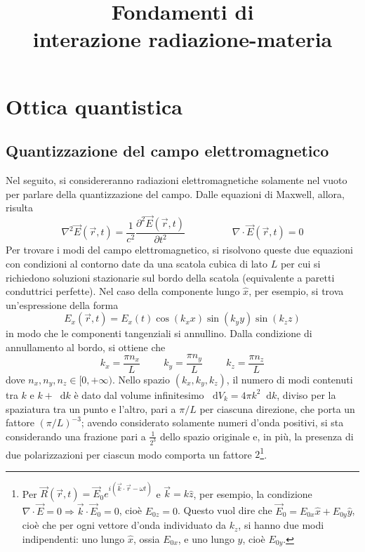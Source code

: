 \documentclass[11pt, a4paper]{scrartcl}
\title{Fondamenti di\\ \vspace{.15cm} interazione radiazione-materia}
\author{}
\date{}
\theoremstyle{style}
\renewcommand{\maketitle}{
\begin{center}
{\sffamily
{\fontsize{20}{20}\selectfont\MakeUppercase\thetitle}}

\vspace{0.2in}

{\large\scshape\sffamily\theauthor}
\end{center}
}
\newcommand{\dd}{\mathop{}\!\mathrm{d}}
\numberwithin{equation}{subsection}
\begin{document}
\maketitle
\newpage
\tableofcontents 
\newpage
\section{Ottica quantistica}

\subsection{Quantizzazione del campo elettromagnetico}

Nel seguito, si considereranno radiazioni elettromagnetiche solamente nel vuoto per parlare della quantizzazione del campo.
Dalle equazioni di Maxwell, allora, risulta
\begin{equation}
	\nabla ^2 \vec{E}(\vec{r},t) = \frac{1}{c^2} \frac{\partial ^2 \vec{E}(\vec{r},t)}{\partial t^2}  \hspace{2cm} \nabla \cdot \vec{E}(\vec{r},t) = 0
\end{equation}
Per trovare i modi del campo elettromagnetico, si risolvono queste due equazioni con condizioni al contorno date da una scatola cubica di lato $L$ per cui si richiedono soluzioni stazionarie sul bordo della scatola (equivalente a paretti conduttrici perfette).
Nel caso della componente lungo $\hat{x}$, per esempio, si trova un'espressione della forma 
\begin{equation}
	E_x(\vec{r},t) = E_x(t) \cos (k_x x ) \sin (k_y y ) \sin(k_z z)
\end{equation}
in modo che le componenti tangenziali si annullino.
Dalla condizione di annullamento al bordo, si ottiene che 
\begin{equation}
	k_x = \frac{\pi n_x}{L} \hspace{1cm} k_y = \frac{\pi n_y}{L} \hspace{1cm} k_z = \frac{\pi n_z}{L}
\end{equation}
dove $n_x,n_y,n_z \in [0,+\infty)$.
Nello spazio $(k_x,k_y,k_z)$, il numero di modi contenuti tra $k$ e $k +\dd k$ \`e dato dal volume infinitesimo $\dd V_k = 4 \pi k^2 \dd k$, diviso per la spaziatura tra un punto e l'altro, pari a $\pi / L$ per ciascuna direzione, che porta un fattore $(\pi / L ) ^{-3}$; avendo considerato solamente numeri d'onda positivi, si sta considerando una frazione pari a $\frac{1}{2^3}$ dello spazio originale e, in pi\`u, la presenza di due polarizzazioni per ciascun modo comporta un fattore $2$\footnote{Per $\vec{R}(\vec{r},t) = \vec{E}_0 e^{i (\vec{k}\cdot \vec{r}-\omega t)}$ e $\vec{k} = k \hat{z}$, per esempio, la condizione $\nabla \cdot \vec{E} = 0 \Rightarrow  \vec{k} \cdot \vec{E}_0 = 0$,  cio\`e $E_{0z}=0$. Questo vuol dire che $\vec{E}_0 = E_{0x}\hat{x} + E_{0y}\hat{y}$, cio\`e che per ogni vettore d'onda individuato da $k_z$, si hanno due modi indipendenti: uno lungo $\hat{x}$, ossia $E_{0x}$, e uno lungo $\hat{y}$, cio\`e $E_{0y}$.}.
\end{document}
